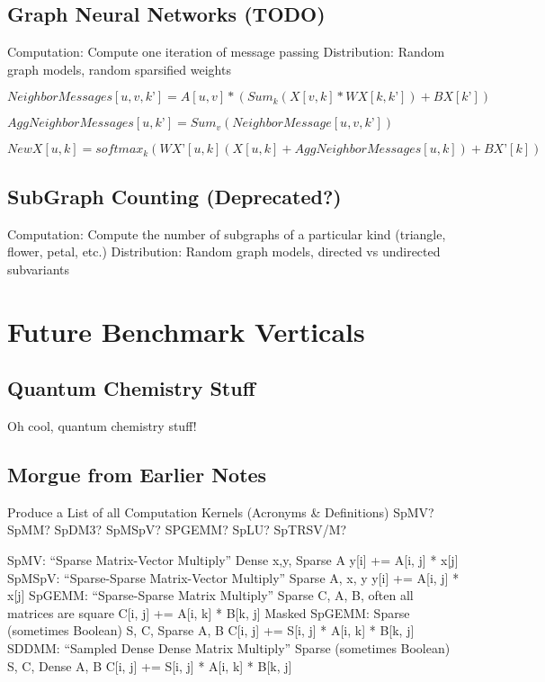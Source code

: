 \documentclass{article}
\begin{document}
\subsection{Graph Neural Networks (TODO)}
	Computation: Compute one iteration of message passing
	Distribution: Random graph models, random sparsified weights

$NeighborMessages[u, v, k’] = A[u, v]*(Sum_k(X[v, k]*WX[k, k’]) +BX[k’])  $

$AggNeighborMessages[u, k’] = Sum_v(NeighborMessage[u, v, k’])$

$NewX[u, k] = softmax_k(WX’[u,k](X[u, k] +AggNeighborMessages[u,k]) + BX’[k]) $

\subsection{SubGraph Counting (Deprecated?)}
	Computation: Compute the number of subgraphs of a particular kind (triangle, flower, petal, etc.)
	Distribution: Random graph models, directed vs undirected subvariants

\section{Future Benchmark Verticals}

\subsection{Quantum Chemistry Stuff}
Oh cool, quantum chemistry stuff!

\subsection{Morgue from Earlier Notes}

Produce a List of all Computation Kernels (Acronyms \& Definitions)
SpMV? SpMM? SpDM3? SpMSpV? SPGEMM? SpLU? SpTRSV/M?

SpMV:
	“Sparse Matrix-Vector Multiply”
Dense x,y, Sparse A
y[i] += A[i, j] * x[j]
SpMSpV:
	“Sparse-Sparse Matrix-Vector Multiply”
Sparse A, x, y
y[i] += A[i, j] * x[j]
SpGEMM:
	“Sparse-Sparse Matrix Multiply”
Sparse C, A, B, often all matrices are square
C[i, j] += A[i, k] * B[k, j]
Masked SpGEMM:
	Sparse (sometimes Boolean) S, C, Sparse A, B
C[i, j] += S[i, j] * A[i, k] * B[k, j]
SDDMM:
	“Sampled Dense Dense Matrix Multiply”
	Sparse (sometimes Boolean) S, C, Dense A, B
C[i, j] += S[i, j] * A[i, k] * B[k, j]
\end{document}
